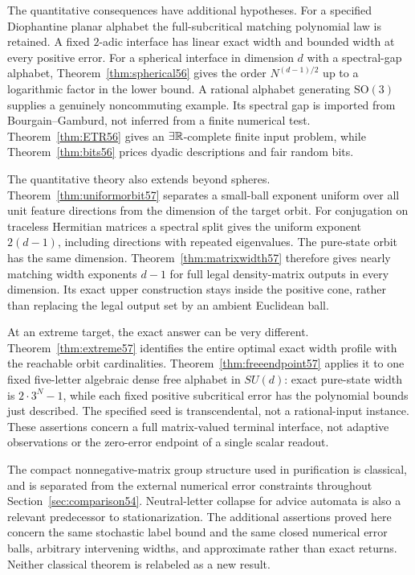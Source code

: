 The quantitative consequences have additional hypotheses. For a specified Diophantine planar alphabet the full-subcritical matching polynomial law is retained. A fixed $2$-adic interface has linear exact width and bounded width at every positive error. For a spherical interface in dimension $d$ with a spectral-gap alphabet, Theorem~\ref{thm:spherical56} gives the order $N^{(d-1)/2}$ up to a logarithmic factor in the lower bound. A rational alphabet generating $\mathrm{SO}(3)$ supplies a genuinely noncommuting example. Its spectral gap is imported from Bourgain--Gamburd, not inferred from a finite numerical test. Theorem~\ref{thm:ETR56} gives an $\exists\mathbb R$-complete finite input problem, while Theorem~\ref{thm:bits56} prices dyadic descriptions and fair random bits.


The quantitative theory also extends beyond spheres. Theorem~\ref{thm:uniformorbit57} separates a small-ball exponent uniform over all unit feature directions from the dimension of the target orbit. For conjugation on traceless Hermitian matrices a spectral split gives the uniform exponent $2(d-1)$, including directions with repeated eigenvalues. The pure-state orbit has the same dimension. Theorem~\ref{thm:matrixwidth57} therefore gives nearly matching width exponents $d-1$ for full legal density-matrix outputs in every dimension. Its exact upper construction stays inside the positive cone, rather than replacing the legal output set by an ambient Euclidean ball.

At an extreme target, the exact answer can be very different. Theorem~\ref{thm:extreme57} identifies the entire optimal exact width profile with the reachable orbit cardinalities. Theorem~\ref{thm:freeendpoint57} applies it to one fixed five-letter algebraic dense free alphabet in $SU(d)$: exact pure-state width is $2\cdot3^N-1$, while each fixed positive subcritical error has the polynomial bounds just described. The specified seed is transcendental, not a rational-input instance. These assertions concern a full matrix-valued terminal interface, not adaptive observations or the zero-error endpoint of a single scalar readout.

The compact nonnegative-matrix group structure used in purification is classical, and is separated from the external numerical error constraints throughout Section~\ref{sec:comparison54}. Neutral-letter collapse for advice automata is also a relevant predecessor to stationarization. The additional assertions proved here concern the same stochastic label bound and the same closed numerical error balls, arbitrary intervening widths, and approximate rather than exact returns. Neither classical theorem is relabeled as a new result.

